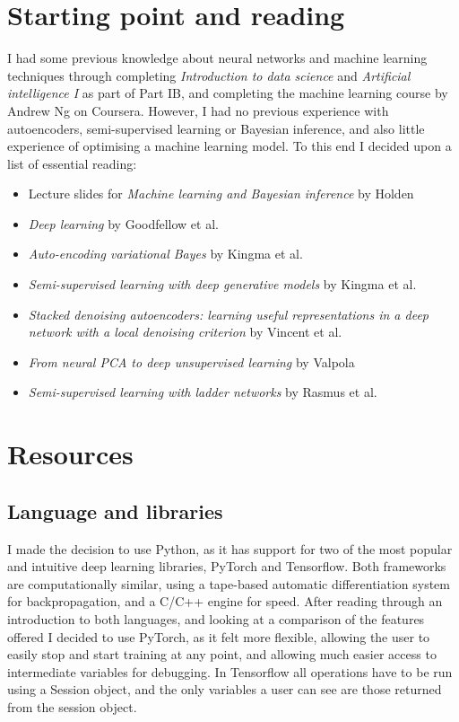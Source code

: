 \documentclass[12pt,a4paper,twoside,openright]{report}
\begin{document}
\section{Starting point and reading} \label{reading}

I had some previous knowledge about neural networks and machine learning techniques through completing \textit{Introduction to data science}
and \textit{Artificial intelligence I} as part of Part IB, and completing the machine learning course by Andrew Ng on Coursera. However,
I had no previous experience with autoencoders, semi-supervised learning or Bayesian inference, and also little experience of optimising 
a machine learning model. To this end I decided upon a list of essential reading:

\begin{itemize}
  \item Lecture slides for \textit{Machine learning and Bayesian inference} by Holden~\cite{ML_Bayes}
  \item \textit{Deep learning} by Goodfellow et al.~\cite{Goodfellow-et-al-2016}
  \item \textit{Auto-encoding variational Bayes} by Kingma et al.~\cite{DBLP:journals/corr/KingmaW13}
  \item \textit{Semi-supervised learning with deep generative models} by Kingma et al.~\cite{DBLP:journals/corr/KingmaRMW14}
  \item \textit{Stacked denoising autoencoders: learning useful representations in a deep network with a local denoising criterion} by 
        Vincent et al.~\cite{Vincent:2010:SDA:1756006.1953039}
  \item \textit{From neural PCA to deep unsupervised learning} by Valpola~\cite{DBLP:journals/corr/Valpola14}
  \item \textit{Semi-supervised learning with ladder networks} by Rasmus et al.~\cite{DBLP:journals/corr/RasmusVHBR15}
\end{itemize}

\section{Resources}

\subsection{Language and libraries}
I made the decision to use Python, as it has support for two of the most popular and intuitive deep learning libraries, PyTorch and 
Tensorflow. Both frameworks are computationally similar, using a tape-based automatic differentiation system for backpropagation, and a C/C++ 
engine for speed. After reading through an introduction to both languages, and looking at a comparison of the features offered I decided to 
use PyTorch, as it felt more flexible, allowing the user to easily stop and start training at any point, and allowing much easier access 
to intermediate variables for debugging. In Tensorflow all operations have to be run using a Session object, and the only variables a 
user can see are those returned from the session object.
\end{document}
